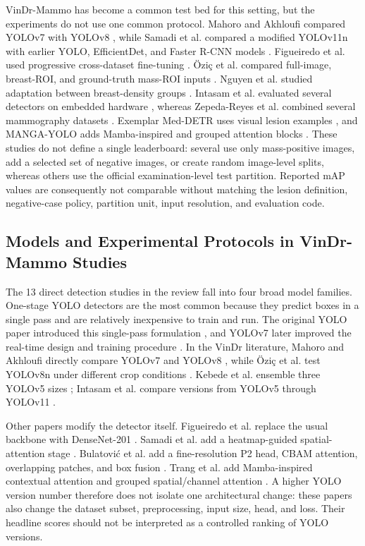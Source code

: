 VinDr-Mammo has become a common test bed for this setting, but the experiments
do not use one common protocol. Mahoro and Akhloufi compared YOLOv7 with YOLOv8
\cite{mahoro2023oneshot}, while Samadi et al. compared a modified YOLOv11n with
earlier YOLO, EfficientDet, and Faster R-CNN models \cite{samadi2026yolo}.
Figueiredo et al. used progressive cross-dataset fine-tuning
\cite{figueiredo2026progressive}. \"{O}zi\c{c} et al. compared full-image,
breast-ROI, and ground-truth mass-ROI inputs \cite{ozic2023scenarios}. Nguyen et
al. studied adaptation between breast-density groups
\cite{nguyen2023crossdensity}. Intasam et al. evaluated several detectors on
embedded hardware \cite{intasam2025embedded}, whereas Zepeda-Reyes et al.
combined several mammography datasets \cite{zepeda2026density}. Exemplar
Med-DETR uses visual lesion examples \cite{bhat2025exemplar}, and MANGA-YOLO
adds Mamba-inspired and grouped attention blocks \cite{trang2025manga}. These
studies do not define a single leaderboard:
several use only mass-positive images, add a selected set of negative images,
or create random image-level splits, whereas others use the official
examination-level test partition.  Reported mAP values are consequently not
comparable without matching the lesion definition, negative-case policy,
partition unit, input resolution, and evaluation code.

\subsection{Models and Experimental Protocols in VinDr-Mammo Studies}
\label{sec:background_vindr_models}

The 13 direct detection studies in the review fall into four broad model
families. One-stage YOLO detectors are the most common because they predict
boxes in a single pass and are relatively inexpensive to train and run. The
original YOLO paper introduced this single-pass formulation
\cite{redmon2016yolo}, and YOLOv7 later improved the real-time design and
training procedure \cite{wang2023yolov7}. In the VinDr literature, Mahoro and
Akhloufi directly compare YOLOv7 and YOLOv8 \cite{mahoro2023oneshot}, while
\"{O}zi\c{c} et al. test YOLOv8n under different crop conditions
\cite{ozic2023scenarios}. Kebede et al. ensemble three YOLOv5 sizes
\cite{kebede2024dualview}; Intasam et al. compare versions from YOLOv5 through
YOLOv11 \cite{intasam2025embedded}.

Other papers modify the detector itself. Figueiredo et al. replace the usual
backbone with DenseNet-201 \cite{figueiredo2026progressive}. Samadi et al. add a
heatmap-guided spatial-attention stage \cite{samadi2026yolo}. Bulatovi\'{c} et
al. add a fine-resolution P2 head, CBAM attention, overlapping patches, and box
fusion \cite{bulatovic2025patched}. Trang et al. add Mamba-inspired contextual
attention and grouped spatial/channel attention \cite{trang2025manga}. A
higher YOLO version number therefore does not isolate one architectural change:
these papers also change the dataset subset, preprocessing, input size, head,
and loss. Their headline scores should not be interpreted as a controlled
ranking of YOLO versions.

